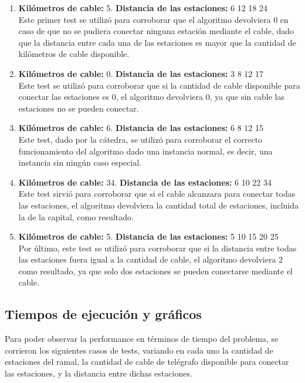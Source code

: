 \documentclass[10pt, a4paper]{article}
\begin{document}
\begin{enumerate}
	\item \textbf{Kil\'ometros de cable:} 5. \textbf{Distancia de las estaciones:} 6 12 18 24\\
	Este primer test se utiliz\'o para corroborar que el algoritmo devolviera 0 en caso de que no se pudiera conectar ninguna estación mediante el cable, dado que la distancia entre cada una de las estaciones es mayor que la cantidad de kil\'ometros de cable disponible.
	
	\item \textbf{Kil\'ometros de cable:} 0. \textbf{Distancia de las estaciones:} 3 8 12 17\\
	Este test se utiliz\'o para corroborar que si la cantidad de cable disponible para conectar las estaciones es 0, el algoritmo devolviera 0, ya que sin cable las estaciones no se pueden conectar.
	
	\item \textbf{Kil\'ometros de cable:} 6. \textbf{Distancia de las estaciones:} 6 8 12 15\\
	Este test, dado por la c\'atedra, se utiliz\'o para corroborar el correcto funcionamiento del algoritmo dado una instancia normal, es decir, una instancia sin ning\'un caso especial.
	
	\item \textbf{Kil\'ometros de cable:} 34. \textbf{Distancia de las estaciones:} 6 10 22 34\\
	Este test sirvi\'o para corroborar que si el cable alcanzara para conectar todas las estaciones, el algoritmo devolviera la cantidad total de estaciones, incluida la de la capital, como resultado. 
	
	\item \textbf{Kil\'ometros de cable:} 5. \textbf{Distancia de las estaciones:} 5 10 15 20 25\\
	Por \'ultimo, este test se utiliz\'o para corroborar que si la distancia entre todas las estaciones fuera igual a la cantidad de cable, el algoritmo devolviera 2 como resultado, ya que solo dos estaciones se pueden conectarse mediante el cable.
\end{enumerate}

\subsection{Tiempos de ejecuci\'on y gr\'aficos}

Para poder observar la performance en t\'erminos de tiempo del problema, se corrieron los siguientes casos de tests, variando en cada uno la cantidad de estaciones del ramal, la cantidad de cable de tel\'egrafo disponible para conectar las estaciones, y la distancia entre dichas estaciones.
\end{document}
